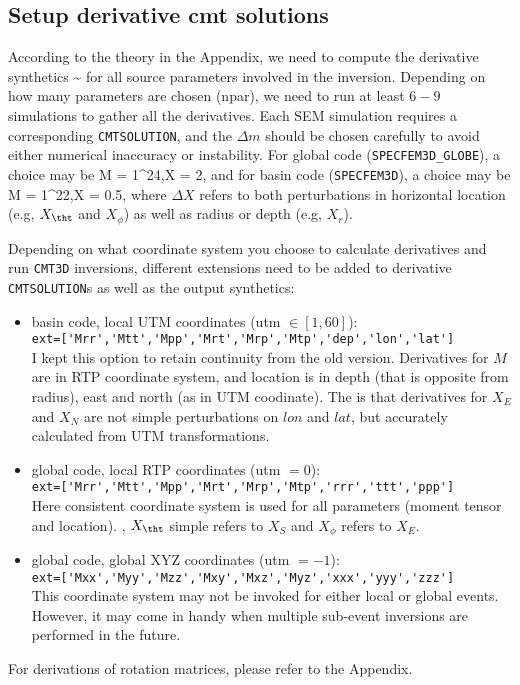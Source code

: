 \documentclass[12pt,titlepage,fleqn]{article}
\begin{document}
\subsection{Setup derivative cmt solutions}
According to the theory in the Appendix, we need to compute the derivative synthetics 
\eq {} \sim {} \en
for all source parameters involved in the inversion. Depending on how many parameters are chosen (npar), we need to run at least $6-9$ simulations to gather all the derivatives. Each SEM simulation requires a corresponding \verb+CMTSOLUTION+, and the $\Delta m$ should be chosen carefully to avoid either numerical inaccuracy or instability. For global code (\verb+SPECFEM3D_GLOBE+), a choice may be
\eq
\Delta M = 1^{24},\quad \Delta X = 2,
\en
and for basin code (\verb+SPECFEM3D+), a choice may be
\eq
\Delta M = 1^{22},\quad \Delta X = 0.5,
\en
where $\Delta X$ refers to both perturbations in horizontal location (e.g, $X_\tht$ and $X_\phi$) as well as radius or depth (e.g, $X_r$).

Depending on what coordinate system you choose to calculate derivatives and run \verb+CMT3D+ inversions, different extensions need to be added to derivative \verb+CMTSOLUTION+s as well as the output synthetics:
\begin{itemize}
\item basin code, local UTM coordinates (utm $\in[1,60]$): \\
   \verb+ext=['Mrr','Mtt','Mpp','Mrt','Mrp','Mtp','dep','lon','lat']+ \\
I kept this option to retain continuity from the old version. Derivatives for $M$ are in RTP coordinate system, and location is in depth (that is opposite from radius), east and north (as in UTM coodinate). The  is that derivatives for $X_E$ and $X_N$ are not simple perturbations on $lon$ and $lat$, but accurately calculated from UTM transformations.
\item global code, local RTP coordinates (utm $=0$):\\
   \verb+ext=['Mrr','Mtt','Mpp','Mrt','Mrp','Mtp','rrr','ttt','ppp']+\\
Here consistent coordinate system is used for all parameters (moment tensor and location). , $X_\tht$ simple refers to $X_S$ and $X_\phi$ refers to $X_E$.
\item global code, global XYZ coordinates (utm $=-1$):\\
   \verb+ext=['Mxx','Myy','Mzz','Mxy','Mxz','Myz','xxx','yyy','zzz']+\\
This coordinate system may not be invoked for either local or global events. However, it may come in handy when multiple sub-event inversions are performed in the future.
\end{itemize}
For derivations of rotation matrices, please refer to the Appendix.
\end{document}
